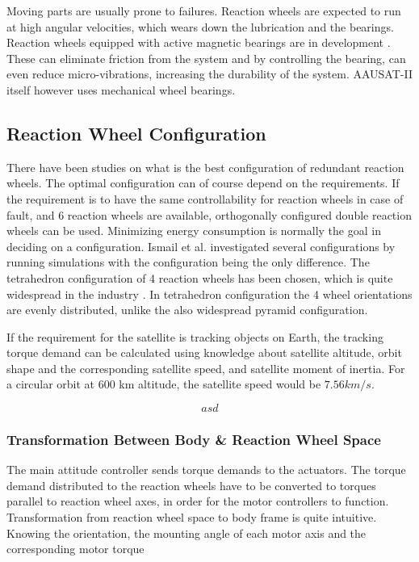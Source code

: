 Moving parts are usually prone to failures. Reaction wheels are expected to run at high angular velocities, which wears down the lubrication and the bearings. Reaction wheels equipped with active magnetic bearings are in development \cite{MagneticReactWheel}. These can eliminate friction from the system and by controlling the bearing, can even reduce micro-vibrations, increasing the durability of the system. AAUSAT-II itself however uses mechanical wheel bearings.

\subsection{Reaction Wheel Configuration}

There have been studies on what is the best configuration of redundant reaction wheels. The optimal configuration can of course depend on the requirements. If the requirement is to have the same controllability for reaction wheels in case of fault, and 6 reaction wheels are available, orthogonally configured double reaction wheels can be used. Minimizing energy consumption is normally the goal in deciding on a configuration. Ismail et al. \cite{ReactionWheelConfigSim} investigated several configurations by running simulations with the configuration being the only difference. The tetrahedron configuration of 4 reaction wheels has been chosen, which is quite widespread in the industry \cite{reactConfigNasa}.
In tetrahedron configuration the 4 wheel orientations are evenly distributed, unlike the also widespread pyramid configuration. 

If the requirement for the satellite is tracking objects on Earth, the tracking torque demand can be calculated using knowledge about satellite altitude, orbit shape and the corresponding satellite speed, and satellite moment of inertia. For a circular orbit at 600 km altitude, the satellite speed would be $7.56 km/s$.

\begin{equation}
asd
\end{equation}


\subsubsection{Transformation Between Body \& Reaction Wheel Space}

The main attitude controller sends torque demands to the actuators. The torque demand distributed to the reaction wheels have to be converted to torques parallel to reaction wheel axes, in order for the motor controllers to function. Transformation from reaction wheel space to body frame is quite intuitive. Knowing the orientation, the mounting angle of each motor axis and the corresponding motor torque


